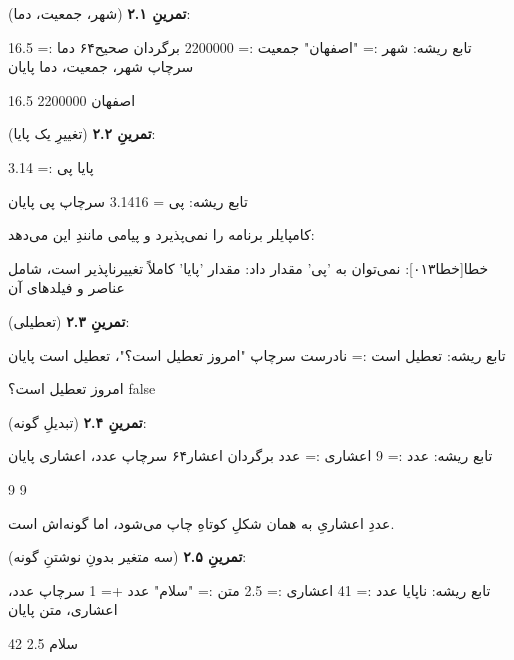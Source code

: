 \textbf{تمرینِ ۲.۱} (شهر، جمعیت، دما):
\begin{salamfa}
تابع ریشه:
    شهر := "اصفهان"
    جمعیت := 2200000 برگردان صحیح۶۴
    دما := 16.5
    سرچاپ شهر، جمعیت، دما
پایان
\end{salamfa}

\begin{progoutfa}
اصفهان 2200000 16.5
\end{progoutfa}

\textbf{تمرینِ ۲.۲} (تغییرِ یک پایا):
\begin{salamfa}
پایا پی := 3.14

تابع ریشه:
    پی = 3.1416
    سرچاپ پی
پایان
\end{salamfa}

کامپایلر برنامه را نمی‌پذیرد و پیامی مانندِ این می‌دهد:

\begin{progoutfa}
خطا[خطا۰۱۳]: نمی‌توان به 'پی' مقدار داد: مقدار 'پایا' کاملاً تغییرناپذیر است، شامل عناصر و فیلدهای آن
\end{progoutfa}

\textbf{تمرینِ ۲.۳} (تعطیلی):
\begin{salamfa}
تابع ریشه:
    تعطیل است := نادرست
    سرچاپ "امروز تعطیل است؟"، تعطیل است
پایان
\end{salamfa}

\begin{progoutfa}
امروز تعطیل است؟ false
\end{progoutfa}

\textbf{تمرینِ ۲.۴} (تبدیلِ گونه):
\begin{salamfa}
تابع ریشه:
    عدد := 9
    اعشاری := عدد برگردان اعشار۶۴
    سرچاپ عدد، اعشاری
پایان
\end{salamfa}

\begin{progoutfa}
9 9
\end{progoutfa}

عددِ اعشاریِ  به همان شکلِ کوتاهِ  چاپ می‌شود، اما گونه‌اش  است.

\textbf{تمرینِ ۲.۵} (سه متغیر بدونِ نوشتنِ گونه):
\begin{salamfa}
تابع ریشه:
    ناپایا عدد := 41
    اعشاری := 2.5
    متن := "سلام"
    عدد += 1
    سرچاپ عدد، اعشاری، متن
پایان
\end{salamfa}

\begin{progoutfa}
42 2.5 سلام
\end{progoutfa}

